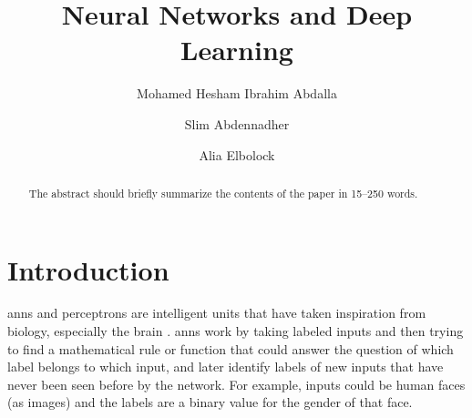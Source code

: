 \documentclass[runningheads]{llncs}
\begin{document}
%
\title{Neural Networks and Deep Learning }
%
%
\author{Mohamed Hesham Ibrahim Abdalla \and
Slim Abdennadher \and
Alia Elbolock}
%
%
%
\maketitle              %
%
\begin{abstract}
The abstract should briefly summarize the contents of the paper in
15--250 words.

\end{abstract}
%
%
%
\section{Introduction}

\gls{anns} and perceptrons are intelligent units that have taken inspiration
from biology, especially the brain \cite{hassoun1995fundamentals}. \gls{anns} work by taking labeled inputs
and then trying to find a mathematical rule or function that could answer the question
of which label belongs to which input, and later identify labels of new inputs that have never been seen before by the network. For example, inputs could be human faces (as images) and the labels are 
a binary value for the gender of that face.
\end{document}
